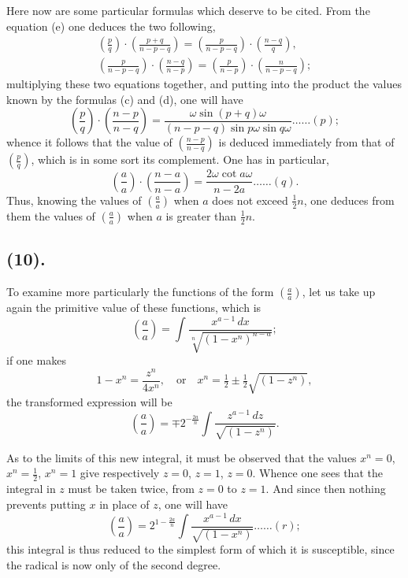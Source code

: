 \documentclass{article}
\begin{document}
Here now are some particular formulas which deserve to be cited. From the equation (e) one deduces the two following,
\[ \begin{gathered} \left(\frac{p}{q}\right)\cdot\left(\frac{p+q}{n-p-q}\right)=\left(\frac{p}{n-p-q}\right)\cdot\left(\frac{n-q}{q}\right),\\ \left(\frac{p}{n-p-q}\right)\cdot\left(\frac{n-q}{n-p}\right)=\left(\frac{p}{n-p}\right)\cdot\left(\frac{n}{n-p-q}\right); \end{gathered} \]
multiplying these two equations together, and putting into the product the values known by the formulas (c) and (d), one will have
\[ \left(\frac{p}{q}\right)\cdot\left(\frac{n-p}{n-q}\right)=\frac{\omega\sin(p+q)\omega}{(n-p-q)\sin p\omega\sin q\omega}\ldots\ldots(p); \]
whence it follows that the value of $\left(\frac{n-p}{n-q}\right)$ is deduced immediately from that of $\left(\frac{p}{q}\right)$, which is in some sort its complement. One has in particular,
\[ \left(\frac{a}{a}\right)\cdot\left(\frac{n-a}{n-a}\right)=\frac{2\omega\cot a\omega}{n-2a}\ldots\ldots(q). \]
Thus, knowing the values of $\left(\frac{a}{a}\right)$ when $a$ does not exceed $\frac{1}{2}n$, one deduces from them the values of $\left(\frac{a}{a}\right)$ when $a$ is greater than $\frac{1}{2}n$.

\subsection*{(10).}

To examine more particularly the functions of the form $\left(\frac{a}{a}\right)$, let us take up again the primitive value of these functions, which is
\[ \left(\frac{a}{a}\right)=\int\frac{x^{a-1}\,dx}{\sqrt[n]{(1-x^{n})^{n-a}}}; \]
if one makes
\[ 1-x^{n}=\frac{z^{n}}{4x^{n}},\quad\text{or}\quad x^{n}=\tfrac{1}{2}\pm\tfrac{1}{2}\sqrt{(1-z^{n})}, \]
the transformed expression will be
\[ \left(\frac{a}{a}\right)=\mp 2^{-\frac{2a}{n}}\int\frac{z^{a-1}\,dz}{\sqrt{(1-z^{n})}}. \]

As to the limits of this new integral, it must be observed that the values $x^{n}=0$, $x^{n}=\frac{1}{2}$, $x^{n}=1$ give respectively $z=0$, $z=1$, $z=0$. Whence one sees that the integral in $z$ must be taken twice, from $z=0$ to $z=1$. And since then nothing prevents putting $x$ in place of $z$, one will have
\[ \left(\frac{a}{a}\right)=2^{1-\frac{2a}{n}}\int\frac{x^{a-1}\,dx}{\sqrt{(1-x^{n})}}\ldots\ldots(r); \]
this integral is thus reduced to the simplest form of which it is susceptible, since the radical is now only of the second degree.
\end{document}
